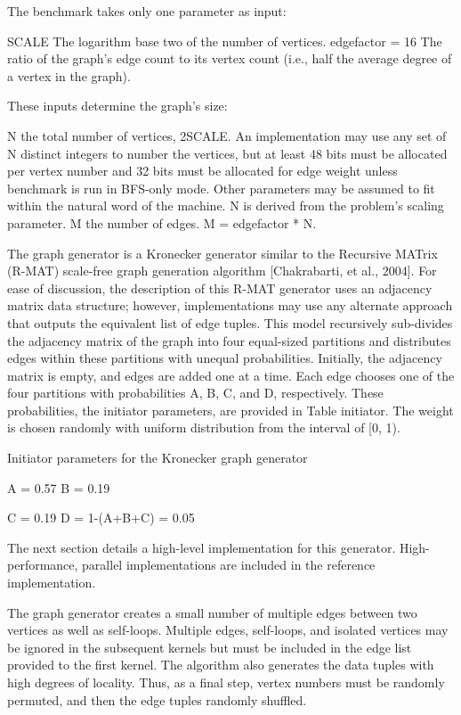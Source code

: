 \documentclass{article}
\begin{document}
The benchmark takes only one parameter as input:

SCALE The logarithm base two of the number of vertices. edgefactor = 16 The ratio of the graph's edge count to its vertex count (i.e., half the average degree of a vertex in the graph).

These inputs determine the graph's size:

N the total number of vertices, 2SCALE. An implementation may use any set of N distinct integers to number the vertices, but at least 48 bits must be allocated per vertex number and 32 bits must be allocated for edge weight unless benchmark is run in BFS-only mode. Other parameters may be assumed to fit within the natural word of the machine. N is derived from the problem's scaling parameter. M the number of edges. M = edgefactor * N.

The graph generator is a Kronecker generator similar to the Recursive MATrix (R-MAT) scale-free graph generation algorithm [Chakrabarti, et al., 2004]. For ease of discussion, the description of this R-MAT generator uses an adjacency matrix data structure; however, implementations may use any alternate approach that outputs the equivalent list of edge tuples. This model recursively sub-divides the adjacency matrix of the graph into four equal-sized partitions and distributes edges within these partitions with unequal probabilities. Initially, the adjacency matrix is empty, and edges are added one at a time. Each edge chooses one of the four partitions with probabilities A, B, C, and D, respectively. These probabilities, the initiator parameters, are provided in Table initiator. The weight is chosen randomly with uniform distribution from the interval of [0, 1).

Initiator parameters for the Kronecker graph generator

A = 0.57 B = 0.19

C = 0.19 D = 1-(A+B+C) = 0.05

The next section details a high-level implementation for this generator. High-performance, parallel implementations are included in the reference implementation.

The graph generator creates a small number of multiple edges between two vertices as well as self-loops. Multiple edges, self-loops, and isolated vertices may be ignored in the subsequent kernels but must be included in the edge list provided to the first kernel. The algorithm also generates the data tuples with high degrees of locality. Thus, as a final step, vertex numbers must be randomly permuted, and then the edge tuples randomly shuffled.
\end{document}
